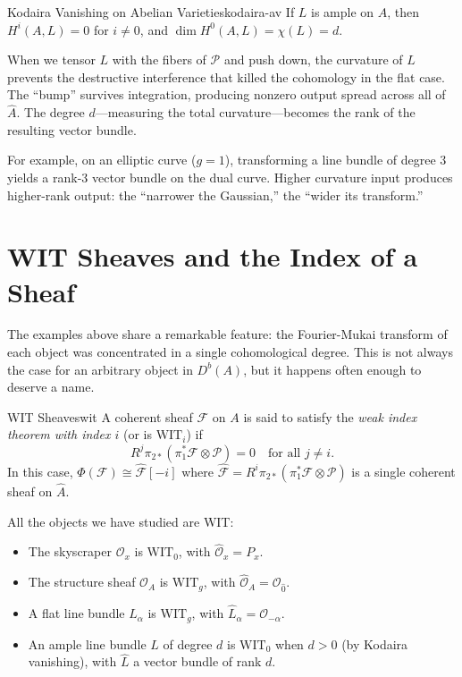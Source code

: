 \documentclass{article}
\newcommand{\CF}{{\mathcal{F}}}
\newcommand{\CO}{{\mathcal{O}}}
\newcommand{\CP}{{\mathcal{P}}}
\begin{document}
\begin{lem}{Kodaira Vanishing on Abelian Varieties}{kodaira-av}
If $L$ is ample on $A$, then $H^i(A, L) = 0$ for $i \neq 0$, and $\dim H^0(A, L) = \chi(L) = d$.
\end{lem}

When we tensor $L$ with the fibers of $\CP$ and push down, the curvature of $L$ prevents the destructive interference that killed the cohomology in the flat case. The ``bump'' survives integration, producing nonzero output spread across all of $\hat{A}$. The degree $d$---measuring the total curvature---becomes the rank of the resulting vector bundle.

For example, on an elliptic curve ($g = 1$), transforming a line bundle of degree $3$ yields a rank-$3$ vector bundle on the dual curve. Higher curvature input produces higher-rank output: the ``narrower the Gaussian,'' the ``wider its transform.''


\section{WIT Sheaves and the Index of a Sheaf}

The examples above share a remarkable feature: the Fourier-Mukai transform of each object was concentrated in a single cohomological degree. This is not always the case for an arbitrary object in $D^b(A)$, but it happens often enough to deserve a name.

\begin{defn}{WIT Sheaves}{wit}
A coherent sheaf $\CF$ on $A$ is said to satisfy the \emph{weak index theorem with index $i$} (or is \emph{$\mathrm{WIT}_i$}) if
\[
    R^j\pi_{2*}(\pi_1^*\CF \otimes \CP) = 0 \quad \text{for all } j \neq i.
\]
In this case, $\Phi(\CF) \cong \hat{\CF}[-i]$ where $\hat{\CF} = R^i\pi_{2*}(\pi_1^*\CF \otimes \CP)$ is a single coherent sheaf on $\hat{A}$.
\end{defn}

All the objects we have studied are WIT:
\begin{itemize}
    \item The skyscraper $\CO_x$ is $\mathrm{WIT}_0$, with $\hat{\CO}_x = P_x$.
    \item The structure sheaf $\CO_A$ is $\mathrm{WIT}_g$, with $\hat{\CO}_A = \CO_{\hat{0}}$.
    \item A flat line bundle $L_\alpha$ is $\mathrm{WIT}_g$, with $\hat{L}_\alpha = \CO_{-\alpha}$.
    \item An ample line bundle $L$ of degree $d$ is $\mathrm{WIT}_0$ when $d > 0$ (by Kodaira vanishing), with $\hat{L}$ a vector bundle of rank $d$.
\end{itemize}
\end{document}
